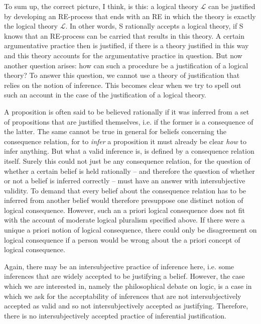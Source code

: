 \documentclass{article}
\begin{document}
To sum up, the correct picture, I think, is this: a logical theory $\mathcal{L}$ can be justified by developing an RE-process that ends with an RE in which the theory is exactly the logical theory $\mathcal{L}$. In other words, S rationally accepts a logical theory, if S knows that an RE-process can be carried that results in this theory. A certain argumentative practice then is justified, if there is a theory justified in this way and this theory accounts for the argumentative practice in question. But now another question arises: how can such a procedure be a justification of a logical theory? To answer this question, we cannot use a theory of justification that relies on the notion of inference. This becomes clear when we try to spell out such an account in the case of the justification of a logical theory. 

A proposition is often said to be believed rationally if it was inferred from a set of propositions that are justified themselves, i.e. if the former is a consequence of the latter. The same cannot be true in general for beliefs concerning the consequence relation, for to \textit{infer} a proposition it must already be clear \textit{how} to infer anything. But what a valid inference is, is defined by a consequence relation itself. Surely this could not just be any consequence relation, for the question of whether a certain belief is held rationally -- and therefore the question of whether or not a belief is inferred correctly -- must have an answer with intersubjective validity. To demand that every belief about the consequence relation has to be inferred from another belief would therefore presuppose one distinct notion of logical consequence. However, such an a priori logical consequence does not fit with the account of moderate logical pluralism specified above. If there were a unique a priori notion of logical consequence, there could only be disagreement on logical consequence if a person would be wrong about the a priori concept of logical consequence. 

Again, there may be an intersubjective practice of inference here, i.e. some inferences that are widely accepted to be justifying a belief. However, the case which we are interested in, namely the philosophical debate on logic, is a case in which we ask for the acceptability of inferences that are not intersubjectively accepted as valid and so not intersubjectively accepted as justifying. Therefore, there is no intersubjectively accepted practice of inferential justification.
\end{document}
